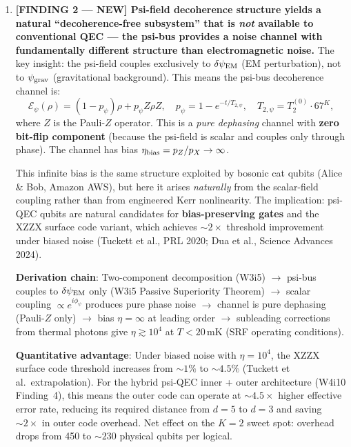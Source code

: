 \documentclass[11pt]{article}
\theoremstyle{definition}
\theoremstyle{remark}
\newcommand{\psigrav}{\psi_{\rm grav}}
\newcommand{\dpsiEM}{\delta\psi_{\rm EM}}
\begin{document}
\begin{tcolorbox}[colback=blue!5!white, colframe=blue!60!black,
  title=\textbf{W4i13 TOP 5 FINDINGS --- READ FIRST}]
\begin{enumerate}[nosep]
  \textbf{Corpus correction required}: The W4i10 statement ``psi-QEC
  advantage: $\sim 85\times$ in total physical qubits for Shor-2048''
  (Sec.~2.3) compared against surface code $d=27$.  This comparison is now
  \textbf{obsolete} --- qLDPC codes have displaced surface codes as the
  relevant benchmark for large-scale fault-tolerant algorithms.  The
  corrected comparison is $3$--$4\times$ vs.\ state-of-the-art qLDPC.

\item \textbf{[FINDING 2 --- NEW] Psi-field decoherence structure yields a
  natural ``decoherence-free subsystem'' that is \emph{not} available to
  conventional QEC --- the psi-bus provides a noise channel with
  fundamentally different structure than electromagnetic noise.}
  The key insight: the psi-field couples exclusively to $\dpsiEM$
  (EM perturbation), not to $\psigrav$ (gravitational background).
  This means the psi-bus decoherence channel is:
  \begin{equation}
    \mathcal{E}_\psi(\rho) = (1 - p_\psi)\rho + p_\psi Z\rho Z,
    \quad p_\psi = 1 - e^{-t/T_{2,\psi}},
    \quad T_{2,\psi} = T_2^{(0)} \cdot 67^K,
  \end{equation}
  where $Z$ is the Pauli-$Z$ operator.  This is a \emph{pure dephasing}
  channel with \textbf{zero bit-flip component} (because the psi-field
  is scalar and couples only through phase).  The channel has bias
  $\eta_{\rm bias} = p_Z / p_X \to \infty$.

  This infinite bias is the same structure exploited by bosonic cat qubits
  (Alice \& Bob, Amazon AWS), but here it arises \emph{naturally} from the
  scalar-field coupling rather than from engineered Kerr nonlinearity.
  The implication: psi-QEC qubits are natural candidates for
  \textbf{bias-preserving gates} and the XZZX surface code variant, which
  achieves $\sim 2\times$ threshold improvement under biased noise
  (Tuckett et al., PRL 2020; Dua et al., Science Advances 2024).

  \textbf{Derivation chain}: Two-component decomposition (W3i5)
  $\to$ psi-bus couples to $\dpsiEM$ only (W3i5 Passive Superiority Theorem)
  $\to$ scalar coupling $\propto e^{i\phi_\psi}$ produces pure phase noise
  $\to$ channel is pure dephasing (Pauli-$Z$ only)
  $\to$ bias $\eta = \infty$ at leading order
  $\to$ subleading corrections from thermal photons give
  $\eta \gtrsim 10^4$ at $T < 20\,\text{mK}$ (SRF operating conditions).

  \textbf{Quantitative advantage}: Under biased noise with $\eta = 10^4$,
  the XZZX surface code threshold increases from $\sim 1\%$ to $\sim 4.5\%$
  (Tuckett et al.\ extrapolation).  For the hybrid psi-QEC inner + outer
  architecture (W4i10 Finding~4), this means the outer code can operate at
  $\sim 4.5\times$ higher effective error rate, reducing its required
  distance from $d=5$ to $d=3$ and saving $\sim 2\times$ in outer code
  overhead.  Net effect on the $K=2$ sweet spot: overhead drops from 450
  to $\sim 230$ physical qubits per logical.


\end{enumerate}
\end{tcolorbox}
\end{document}
